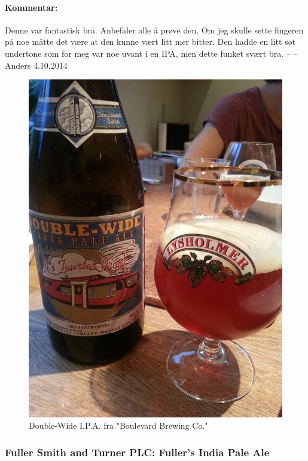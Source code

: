 \documentclass[12pt,a4paper,oneside,norsk]{article}
\begin{document}
\paragraph{Kommentar:} Denne var fantastisk bra. Anbefaler alle å prøve den. Om jeg skulle sette fingeren på noe måtte det være at den kunne vært litt mer bitter. Den hadde en litt søt undertone som for meg var noe uvant i en IPA, men dette funket svært bra.
\newline
-- -- Anders 4.10.2014

\begin{figure} [H]
\centering
\includegraphics[scale=0.1, angle=270]{Bilder/Ol/Double-Wide.jpg}
\caption{Double-Wide I.P.A. fra "Boulevard Brewing Co."}
\end{figure}

\newpage
\subsubsection{Fuller Smith and Turner PLC: Fuller's India Pale Ale}
\end{document}

